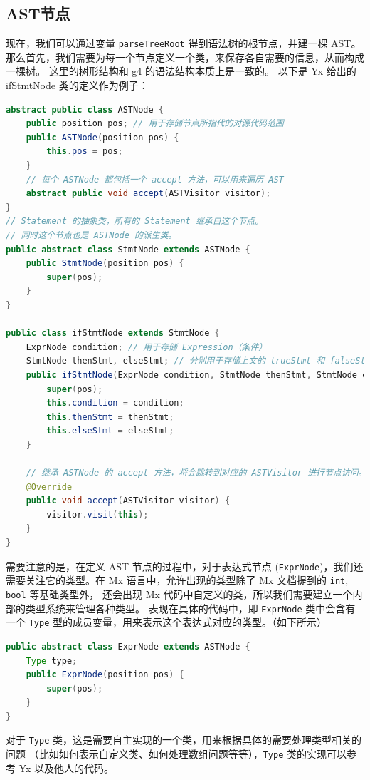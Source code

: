 \subsection{AST节点}
现在，我们可以通过变量 \texttt{parseTreeRoot} 得到语法树的根节点，并建一棵 AST。
那么首先，我们需要为每一个节点定义一个类，来保存各自需要的信息，从而构成一棵树。
这里的树形结构和 g4 的语法结构本质上是一致的。
以下是 Yx 给出的 ifStmtNode 类的定义作为例子：
\begin{lstlisting}[language=Java]
abstract public class ASTNode {
    public position pos; // 用于存储节点所指代的对源代码范围
    public ASTNode(position pos) {
        this.pos = pos;
    }
    // 每个 ASTNode 都包括一个 accept 方法，可以用来遍历 AST
    abstract public void accept(ASTVisitor visitor);
}
// Statement 的抽象类，所有的 Statement 继承自这个节点。
// 同时这个节点也是 ASTNode 的派生类。
public abstract class StmtNode extends ASTNode {
    public StmtNode(position pos) {
        super(pos);
    }
}

public class ifStmtNode extends StmtNode {
    ExprNode condition; // 用于存储 Expression（条件）
    StmtNode thenStmt, elseStmt; // 分别用于存储上文的 trueStmt 和 falseStmt
    public ifStmtNode(ExprNode condition, StmtNode thenStmt, StmtNode elseStmt, position pos) {
        super(pos);
        this.condition = condition;
        this.thenStmt = thenStmt;
        this.elseStmt = elseStmt;
    }
    
    // 继承 ASTNode 的 accept 方法，将会跳转到对应的 ASTVisitor 进行节点访问。
    @Override
    public void accept(ASTVisitor visitor) {
        visitor.visit(this);
    }
}
\end{lstlisting}

需要注意的是，在定义 AST 节点的过程中，对于表达式节点 (\texttt{ExprNode})，我们还需要关注它的类型。在
Mx 语言中，允许出现的类型除了 Mx 文档提到的 \texttt{int}, \texttt{bool} 等基础类型外，
还会出现 Mx 代码中自定义的类，所以我们需要建立一个内部的类型系统来管理各种类型。
表现在具体的代码中，即 \texttt{ExprNode} 类中会含有一个 \texttt{Type}
型的成员变量，用来表示这个表达式对应的类型。（如下所示）
\begin{lstlisting}[language=Java]
public abstract class ExprNode extends ASTNode {
    Type type;
    public ExprNode(position pos) {
        super(pos);
    }
}
\end{lstlisting}
对于 \texttt{Type} 类，这是需要自主实现的一个类，用来根据具体的需要处理类型相关的问题
（比如如何表示自定义类、如何处理数组问题等等），\texttt{Type} 类的实现可以参考 Yx 以及他人的代码。


